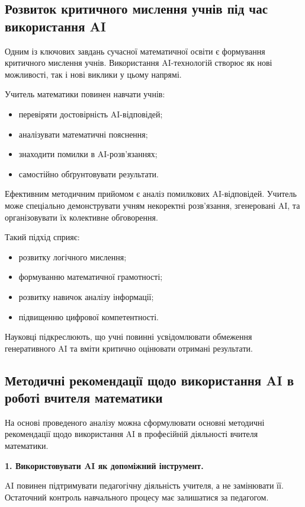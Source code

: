 \subsection{Розвиток критичного мислення учнів під час використання AI}

Одним із ключових завдань сучасної математичної освіти є формування критичного мислення учнів. Використання AI-технологій створює як нові можливості, так і нові виклики у цьому напрямі.

Учитель математики повинен навчати учнів:
\begin{itemize}
\item перевіряти достовірність AI-відповідей;
\item аналізувати математичні пояснення;
\item знаходити помилки в AI-розв’язаннях;
\item самостійно обґрунтовувати результати.
\end{itemize}

Ефективним методичним прийомом є аналіз помилкових AI-відповідей. Учитель може спеціально демонструвати учням некоректні розв’язання, згенеровані AI, та організовувати їх колективне обговорення.

Такий підхід сприяє:
\begin{itemize}
\item розвитку логічного мислення;
\item формуванню математичної грамотності;
\item розвитку навичок аналізу інформації;
\item підвищенню цифрової компетентності.
\end{itemize}

Науковці \cite{Steinbach2025} підкреслюють, що учні повинні усвідомлювати обмеження генеративного AI та вміти критично оцінювати отримані результати.

\subsection{Методичні рекомендації щодо використання AI в роботі вчителя математики}

На основі проведеного аналізу можна сформулювати основні методичні рекомендації щодо використання AI в професійній діяльності вчителя математики.

\textbf{1. Використовувати AI як допоміжний інструмент.}

AI повинен підтримувати педагогічну діяльність учителя, а не замінювати її. Остаточний контроль навчального процесу має залишатися за педагогом.

